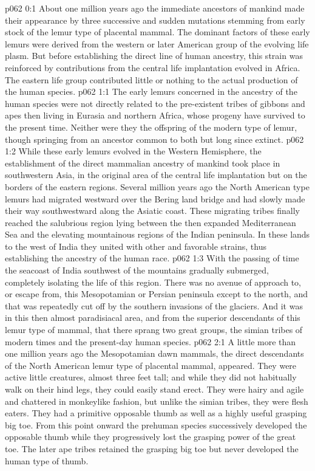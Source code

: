 \author{Life Carrier}
\vs p062 0:1 About one million years ago the immediate ancestors of mankind made their appearance by three successive and sudden mutations stemming from early stock of the lemur type of placental mammal. The dominant factors of these early lemurs were derived from the western or later American group of the evolving life plasm. But before establishing the direct line of human ancestry, this strain was reinforced by contributions from the central life implantation evolved in Africa. The eastern life group contributed little or nothing to the actual production of the human species.
\vs p062 1:1 The early lemurs concerned in the ancestry of the human species were not directly related to the pre\hyp{}existent tribes of gibbons and apes then living in Eurasia and northern Africa, whose progeny have survived to the present time. Neither were they the offspring of the modern type of lemur, though springing from an ancestor common to both but long since extinct.
\vs p062 1:2 While these early lemurs evolved in the Western Hemisphere, the establishment of the direct mammalian ancestry of mankind took place in southwestern Asia, in the original area of the central life implantation but on the borders of the eastern regions. Several million years ago the North American type lemurs had migrated westward over the Bering land bridge and had slowly made their way southwestward along the Asiatic coast. These migrating tribes finally reached the salubrious region lying between the then expanded Mediterranean Sea and the elevating mountainous regions of the Indian peninsula. In these lands to the west of India they united with other and favorable strains, thus establishing the ancestry of the human race.\plusone
\vs p062 1:3 With the passing of time the seacoast of India southwest of the mountains gradually submerged, completely isolating the life of this region. There was no avenue of approach to, or escape from, this Mesopotamian or Persian peninsula except to the north, and that was repeatedly cut off by the southern invasions of the glaciers. And it was in this then almost paradisiacal area, and from the superior descendants of this lemur type of mammal, that there sprang two great groups, the simian tribes of modern times and the present\hyp{}day human species.
\vs p062 2:1 A little more than one million years ago the Mesopotamian dawn mammals, the direct descendants of the North American lemur type of placental mammal,  appeared. They were active little creatures, almost three feet tall; and while they did not habitually walk on their hind legs, they could easily stand erect. They were hairy and agile and chattered in monkeylike fashion, but unlike the simian tribes, they were flesh eaters. They had a primitive opposable thumb as well as a highly useful grasping big toe. From this point onward the prehuman species successively developed the opposable thumb while they progressively lost the grasping power of the great toe. The later ape tribes retained the grasping big toe but never developed the human type of thumb.
